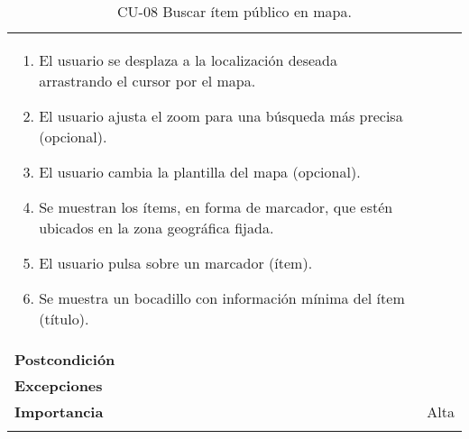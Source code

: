 \begin{longtable}[]{@{}ll@{}}
\begin{minipage}[t]{0.74\columnwidth}
\begin{enumerate}
\def\labelenumi{\arabic{enumi}.}
\tightlist
\item
  El usuario se desplaza a la localización deseada arrastrando el cursor
  por el mapa.
\item
  El usuario ajusta el zoom para una búsqueda más precisa (opcional).
\item
  El usuario cambia la plantilla del mapa (opcional).
\item
  Se muestran los ítems, en forma de marcador, que estén ubicados en la
  zona geográfica fijada.
\item
  El usuario pulsa sobre un marcador (ítem).
\item
  Se muestra un bocadillo con información mínima del ítem (título).
\end{enumerate}\strut
\end{minipage}\tabularnewline
\begin{minipage}[t]{0.20\columnwidth}\raggedright
\textbf{Postcondición}\strut
\end{minipage} & \begin{minipage}[t]{0.74\columnwidth}\raggedright
\strut
\end{minipage}\tabularnewline
\begin{minipage}[t]{0.20\columnwidth}\raggedright
\textbf{Excepciones}\strut
\end{minipage} & \begin{minipage}[t]{0.74\columnwidth}\raggedright
\strut
\end{minipage}\tabularnewline
\begin{minipage}[t]{0.20\columnwidth}\raggedright
\textbf{Importancia}\strut
\end{minipage} & \begin{minipage}[t]{0.74\columnwidth}\raggedright
Alta\strut
\end{minipage}\tabularnewline
\bottomrule
\caption{CU-08 Buscar ítem público en mapa.}
\end{longtable}

